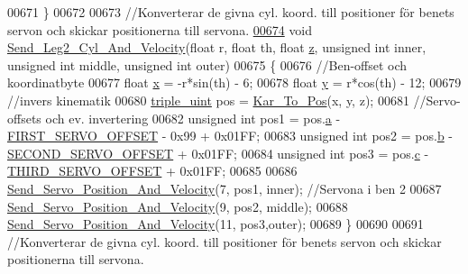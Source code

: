 \begin{DoxyCode}
00671 \}
00672 
00673 \textcolor{comment}{//Konverterar de givna cyl. koord. till positioner för benets servon och skickar positionerna till servona.}
\hypertarget{servo___u_a_r_t_8c_source.tex_l00674}{}\hyperlink{servo___u_a_r_t_8h_a16c2e98e0befea13b10d322b5a13c24a}{00674} \textcolor{keywordtype}{void} \hyperlink{servo___u_a_r_t_8c_a16c2e98e0befea13b10d322b5a13c24a}{Send\_Leg2\_Cyl\_And\_Velocity}(\textcolor{keywordtype}{float} r, \textcolor{keywordtype}{float} th, \textcolor{keywordtype}{float} 
      \hyperlink{over__hinder_8c_af73583b1e980b0aa03f9884812e9fd4d}{z}, \textcolor{keywordtype}{unsigned} \textcolor{keywordtype}{int} inner, \textcolor{keywordtype}{unsigned} \textcolor{keywordtype}{int} middle, \textcolor{keywordtype}{unsigned} \textcolor{keywordtype}{int} outer)
00675 \{
00676     \textcolor{comment}{//Ben-offset och koordinatbyte}
00677     \textcolor{keywordtype}{float} \hyperlink{sensor_8h_a6c4b361d72eb3767ba424ac9a6ecf52b}{x} = -r*sin(th) - 6;
00678     \textcolor{keywordtype}{float} \hyperlink{sensor_8h_a0ed6a908288e0cd87f79c1b5ab56d07c}{y} = r*cos(th) - 12; 
00679     \textcolor{comment}{//invers kinematik }
00680     \hyperlink{structtriple__uint}{triple\_uint} pos = \hyperlink{invers__kinematik_8c_a68f82386196ad991ed54fb9796d90f7c}{Kar\_To\_Pos}(x, y, z);
00681     \textcolor{comment}{//Servo-offsets och ev. invertering }
00682     \textcolor{keywordtype}{unsigned} \textcolor{keywordtype}{int} pos1 = pos.\hyperlink{structtriple__uint_a0ea8a85723620c90be9fd2a693f12a59}{a} - \hyperlink{servo___u_a_r_t_8c_a4c437d01d2f060ec86c16ed5e76efe45}{FIRST\_SERVO\_OFFSET} - 0x99 + 0x01FF;
00683     \textcolor{keywordtype}{unsigned} \textcolor{keywordtype}{int} pos2 = pos.\hyperlink{structtriple__uint_a790d5baa17ec7aaf7bb49750a16e9c29}{b} - \hyperlink{servo___u_a_r_t_8c_acb02dedbe5ff19694bdb5b2ddf61664a}{SECOND\_SERVO\_OFFSET} + 0x01FF;
00684     \textcolor{keywordtype}{unsigned} \textcolor{keywordtype}{int} pos3 = pos.\hyperlink{structtriple__uint_a6ce17b018c47d0f1d0e53a458f741ad3}{c} - \hyperlink{servo___u_a_r_t_8c_ac2f065c44b617c91ea7f4237e8ead729}{THIRD\_SERVO\_OFFSET} + 0x01FF;
00685     
00686     \hyperlink{servo___u_a_r_t_8c_aef28545296037ecc0350638a407a680f}{Send\_Servo\_Position\_And\_Velocity}(7, pos1, inner); \textcolor{comment}{//Servona i ben 2}
00687     \hyperlink{servo___u_a_r_t_8c_aef28545296037ecc0350638a407a680f}{Send\_Servo\_Position\_And\_Velocity}(9, pos2, middle);
00688     \hyperlink{servo___u_a_r_t_8c_aef28545296037ecc0350638a407a680f}{Send\_Servo\_Position\_And\_Velocity}(11, pos3,outer);
00689 \}
00690 
00691 \textcolor{comment}{//Konverterar de givna cyl. koord. till positioner för benets servon och skickar positionerna till servona.}

\end{DoxyCode}
